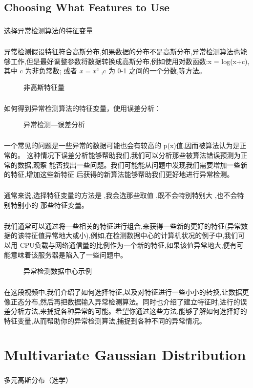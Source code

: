 \documentclass{article}
\begin{document}
\begin{CJK}{UTF8}{gbsn}
\subsection{Choosing What Features to Use}
\subparagraph{}
选择异常检测算法的特征变量
\subparagraph{}
异常检测假设特征符合高斯分布,如果数据的分布不是高斯分布,异常检测算法也能够工作,但是最好调整参数将数据转换成高斯分布,例如使用对数函数:x = log(x+c),其中 c 为非负常数; 或者 $x=x^c$ ,c 为 0-1 之间的一个分数,等方法。
\begin{figure}[H]
\label{fig:942}
\caption{非高斯特征量}
\end{figure}
\subparagraph{}
如何得到异常检测算法的特征变量，使用误差分析：
\begin{figure}[H]
\label{fig:943}
\caption{异常检测—误差分析}
\end{figure}
\subparagraph{}
一个常见的问题是一些异常的数据可能也会有较高的 p(x)值,因而被算法认为是正常的。
这种情况下误差分析能够帮助我们,我们可以分析那些被算法错误预测为正常的数据,观察
能否找出一些问题。我们可能能从问题中发现我们需要增加一些新的特征,增加这些新特征
后获得的新算法能够帮助我们更好地进行异常检测。
\subparagraph{}
通常来说,选择特征变量的方法是 ,我会选那些取值 ,既不会特别特别大 ,也不会特别特别小的 那些特征变量。
\subparagraph{}
我们通常可以通过将一些相关的特征进行组合,来获得一些新的更好的特征(异常数据的该特征值异常地大或小),例如,在检测数据中心的计算机状况的例子中,我们可以用 CPU负载与网络通信量的比例作为一个新的特征,如果该值异常地大,便有可能意味着该服务器是陷入了一些问题中。
\begin{figure}[H]
\label{fig:945}
\caption{异常检测数据中心示例}
\end{figure}
\subparagraph{}
在这段视频中,我们介绍了如何选择特征,以及对特征进行一些小小的转换,让数据更像正态分布,然后再把数据输入异常检测算法。同时也介绍了建立特征时,进行的误差分析方法,来捕捉各种异常的可能。希望你通过这些方法,能够了解如何选择好的特征变量,从而帮助你的异常检测算法,捕捉到各种不同的异常情况。
\begin{figure}[H]
\label{fig:944}
\end{figure}
\section{Multivariate Gaussian Distribution}
\subparagraph{}
多元高斯分布（选学）

\end{CJK}
\end{document}
